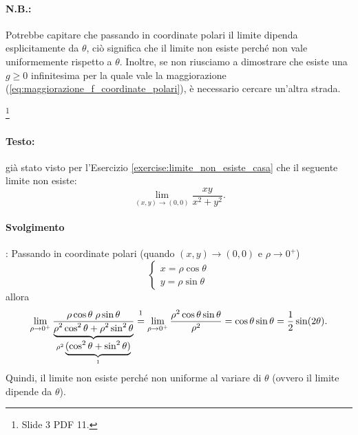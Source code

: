 \paragraph{N.B.:} Potrebbe capitare che passando in coordinate polari il limite dipenda esplicitamente da $\theta$, ciò significa che il limite non esiste perché non vale uniformemente rispetto a $\theta$. Inoltre, se non riusciamo a dimostrare che esiste una $g\geq 0$ infinitesima per la quale vale la maggiorazione (\ref{eq:maggiorazione_f_coordinate_polari}), è necessario cercare un'altra strada.

\begin{example}\footnote{Slide 3 PDF 11.}
    \paragraph{Testo:} già stato visto per l'Esercizio \ref{exercise:limite_non_esiste_casa} che il seguente limite non esiste:
    \begin{equation*}
        \lim\limits_{(x,y)\rightarrow(0,0)}\frac{xy}{x^2+y^2}.
    \end{equation*}
    
    \paragraph{Svolgimento}: Passando in coordinate polari (quando $(x,y)\rightarrow(0,0)$ e $\rho\rightarrow 0^+$)
    \begin{equation*}
        \begin{cases}
            x=\rho\cos\theta\\
            y=\rho\sin\theta
        \end{cases}
    \end{equation*}
    allora 
    \begin{equation*}
        \lim\limits_{\rho\rightarrow 0^+}\frac{\rho\cos\theta\;\rho\sin\theta}{\underbrace{\rho^2\cos^2\theta+\rho^2\sin^2\theta}_{\rho^2\underbrace{(\cos^2\theta+\sin^2\theta)}_{1}}}\overset{\footnotemark}{=}\lim\limits_{\rho\rightarrow 0^+}\frac{\rho^2\cos\theta\sin\theta}{\rho^2}=\cos\theta\sin\theta=\frac{1}{2}\sin(2\theta).
    \end{equation*}
    Quindi, il limite non esiste perché non uniforme al variare di $\theta$ (ovvero il limite dipende da $\theta$).
\end{example}

